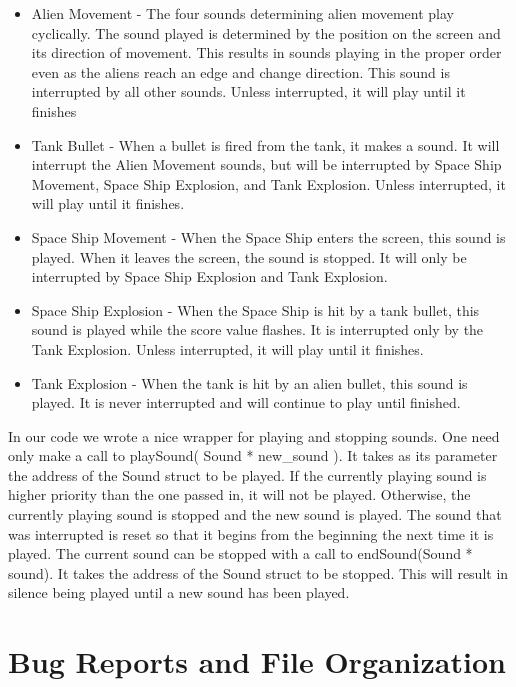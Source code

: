 \documentclass[11pt,letter,oneside]{report}
\begin{document}
\begin{itemize}
\item Alien Movement - The four sounds determining alien movement play cyclically.  The sound played is determined by the position on the screen and its direction of movement.  This results in sounds playing in the proper order even as the aliens reach an edge and change direction.  This sound is interrupted by all other sounds.  Unless interrupted, it will play until it finishes
\item Tank Bullet - When a bullet is fired from the tank, it makes a sound.  It will interrupt the Alien Movement sounds, but will be interrupted by Space Ship Movement, Space Ship Explosion, and Tank Explosion.  Unless interrupted, it will play until it finishes.
\item Space Ship Movement - When the Space Ship enters the screen, this sound is played.  When it leaves the screen, the sound is stopped.  It will only be interrupted by Space Ship Explosion and Tank Explosion.
\item Space Ship Explosion - When the Space Ship is hit by a tank bullet, this sound is played while the score value flashes.  It is interrupted only by the Tank Explosion.  Unless interrupted, it will play until it finishes.
\item Tank Explosion - When the tank is hit by an alien bullet, this sound is played.  It is never interrupted and will continue to play until finished.
\end{itemize}

In our code we wrote a nice wrapper for playing and stopping sounds.  One need only make a call to playSound( Sound * new\_sound ).  It takes as its parameter the address of the Sound struct to be played.  If the currently playing sound is higher priority than the one passed in, it will not be played.  Otherwise, the currently playing sound is stopped and the new sound is played.  The sound that was interrupted is reset so that it begins from the beginning the next time it is played.  The current sound can be stopped with a call to endSound(Sound * sound).  It takes the address of the Sound struct to be stopped.  This will result in silence being played until a new sound has been played.



\chapter{Bug Reports and File Organization}
\end{document}
